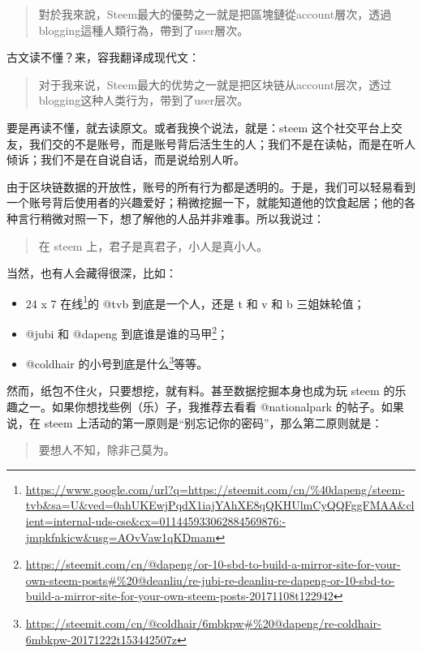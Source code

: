 \documentclass[]{ctexbook}
\providecommand{\tightlist}{%
  \setlength{\itemsep}{0pt}\setlength{\parskip}{0pt}}
\renewcommand{\href}[2]{#2\footnote{\url{#1}}}
\begin{document}
\begin{quote}
對於我來說，Steem最大的優勢之一就是把區塊鏈從account層次，透過blogging這種人類行為，帶到了user層次。
\end{quote}

古文读不懂？来，容我翻译成现代文：

\begin{quote}
对于我来说，Steem最大的优势之一就是把区块链从account层次，透过blogging这种人类行为，带到了user层次。
\end{quote}

要是再读不懂，就去读原文。或者我换个说法，就是：steem 这个社交平台上交友，我们交的不是账号，而是账号背后活生生的人；我们不是在读帖，而是在听人倾诉；我们不是在自说自话，而是说给别人听。

由于区块链数据的开放性，账号的所有行为都是透明的。于是，我们可以轻易看到一个账号背后使用者的兴趣爱好；稍微挖掘一下，就能知道他的饮食起居；他的各种言行稍微对照一下，想了解他的人品并非难事。所以我说过：

\begin{quote}
在 steem 上，君子是真君子，小人是真小人。
\end{quote}

当然，也有人会藏得很深，比如：

\begin{itemize}
\tightlist
\item
  \href{https://www.google.com/url?q=https://steemit.com/cn/\%40dapeng/steem-tvb\&sa=U\&ved=0ahUKEwjPqdX1iajYAhXE8qQKHUlmCyQQFggFMAA\&client=internal-uds-cse\&cx=011445933062884569876:-jmpkfnkicw\&usg=AOvVaw1qKDmam}{24 x 7 在线}的 @tvb 到底是一个人，还是 t 和 v 和 b 三姐妹轮值；
\item
  @jubi 和 @dapeng 到底\href{https://steemit.com/cn/@dapeng/or-10-sbd-to-build-a-mirror-site-for-your-own-steem-posts\#\%20@deanliu/re-jubi-re-deanliu-re-dapeng-or-10-sbd-to-build-a-mirror-site-for-your-own-steem-posts-20171108t122942}{谁是谁的马甲}；
\item
  @coldhair 的\href{https://steemit.com/cn/@coldhair/6mbkpw\#\%20@dapeng/re-coldhair-6mbkpw-20171222t153442507z}{小号到底是什么}等等。
\end{itemize}

然而，纸包不住火，只要想挖，就有料。甚至数据挖掘本身也成为玩 steem 的乐趣之一。如果你想找些例（乐）子，我推荐去看看 @nationalpark 的帖子。如果说，在 steem 上活动的第一原则是``别忘记你的密码''，那么第二原则就是：

\begin{quote}
要想人不知，除非己莫为。
\end{quote}
\end{document}
